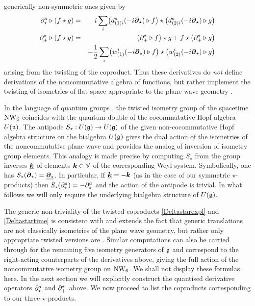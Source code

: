 generically non-symmetric ones given by
\begin{eqnarray}
  \label{defLeibniz}
  \partial^a_\star\triangleright(f\star g)&=& i  \sum\limits_i  
  \bigl(d^a_{(1) i}(- i{{\boldsymbol {\partial} }}_\star)\triangleright f\bigr) \star \bigl(
  d^a_{(2) i}(- i{{\boldsymbol {\partial} }}_\star)\triangleright g\bigr) \\\nonumber
\partial_+^\star\triangleright(f\star g)&=&\left(\partial_+^\star
\triangleright f\right)\star g+f\star\left(\partial_+^\star
\triangleright g\right)\\\nonumber&&
- \frac12 \sum\limits_i  
\bigl(w^i_{(1)}(- i{{\boldsymbol {\partial} }}_\star)\triangleright f\bigr) \star 
\bigl(w^i_{(2)}(- i{{\boldsymbol {\partial} }}_\star)\triangleright g\bigr)
\end{eqnarray}
arising from the twisting of the coproduct. Thus these derivatives do {\it not}
define derivations of the noncommutative algebra of functions, but rather
implement the twisting of isometries of flat space appropriate to the plane wave
geometry \cite{PK1,CFS1,BOL1,Halliday:2005zt}.

In the language of quantum groups \cite{QG1}, the twisted isometry group of the
spacetime $\operatorname{NW}_6$ coincides with the quantum double of the cocommutative Hopf
algebra $U({\mathfrak n})$. The antipode ${S}_\star:U({\mathfrak g})\to U({\mathfrak g})$ of the given
non-cocommutative Hopf algebra structure on the bialgebra $U({\mathfrak g})$ gives the
dual action of the isometries of the noncommutative plane wave and provides the
analog of inversion of isometry group elements. This analogy is made precise by
computing ${S}_\star$ from the group inverses $\underline{{{\boldsymbol {k} }}}$ of elements
${{\boldsymbol {k} }}\in{\mathbb V}$ of the corresponding Weyl system. Symbolically, one has
${S}_\star({{\boldsymbol {\partial} }}_\star)=\underline{{{\boldsymbol {\partial} }}_\star}$. In particular, if
$\underline{{{\boldsymbol {k} }}}=-{{\boldsymbol {k} }}$ (as in the case of our symmetric $\star$-products) then
${S}_\star(\partial_\star^a)=-\partial_\star^a$ and the action of the antipode is trivial.
In what follows we will only require the underlying bialgebra structure of
$U({\mathfrak g})$.

The generic non-triviality of the twisted coproducts \eqref{Deltastarexpl} and
\eqref{Deltastartime} is consistent with and extends the fact that generic
translations are not classically isometries of the plane wave geometry, but
rather only appropriate twisted versions are
\cite{PK1,CFS1,BOL1,Halliday:2005zt}. Similar computations can also be carried
through for the remaining five isometry generators of ${\mathfrak g}$ and correspond to
the right-acting counterparts of the derivatives above, giving the full action
of the noncommutative isometry group on $\operatorname{NW}_6$. We shall not display these
formulas here. In the next section we will explicitly construct the quantised
derivative operators $\partial_\star^a$ and $\partial_+^\star$ above. We now proceed to list
the coproducts corresponding to our three $\star$-products.

